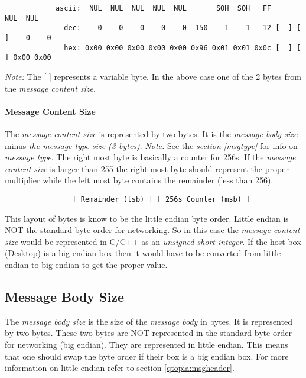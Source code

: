            \begin{verbatim}
            ascii:  NUL  NUL  NUL  NUL  NUL       SOH  SOH   FF            NUL  NUL
              dec:    0    0    0    0    0  150    1    1   12 [  ] [  ]    0    0
              hex: 0x00 0x00 0x00 0x00 0x00 0x96 0x01 0x01 0x0c [  ] [  ] 0x00 0x00
            \end{verbatim}

            \emph{Note:} The [  ] represents a variable byte. In the above
            case one of the 2 bytes from the \emph{message content size}.

                \paragraph{Message Content Size}
                The \emph{message content size}
                is represented by two bytes. It is the
                \emph{message body size} minus
                \emph{the message type size (3 bytes)}.
                \emph{Note:} See the \emph{section \ref{msgtype}} for info
                on \emph{message type}.
                The right most byte is basically a counter for 256s. If the
                \emph{message content size} is larger than 255 the
                right most byte should represent the proper multiplier while
                the left most byte contains the remainder (less than 256).

                \begin{verbatim}
                [ Remainder (lsb) ] [ 256s Counter (msb) ]
                \end{verbatim}
                
                This layout of bytes is know to be
                the little endian byte order. Little endian is NOT the
                standard byte order for networking. So in this case the
                \emph{message content size} would be
                represented in C/C++ as an \emph{unsigned short integer}.
                If the host box (Desktop) is a big endian box then it would
                have to be converted from little endian to big endian to get
                the proper value.
            
        \subsection{Message Body Size}
        
        The \emph{message body size} is the size of the \emph{message body}
        in bytes. It is represented by two bytes. These two bytes are NOT
        represented in the standard byte order for networking (big endian).
        They are represented in little endian. This means that one should
        swap the byte order if their box is a big endian box.
        For more information on little endian
        refer to section \ref{qtopia:msgheader}.

